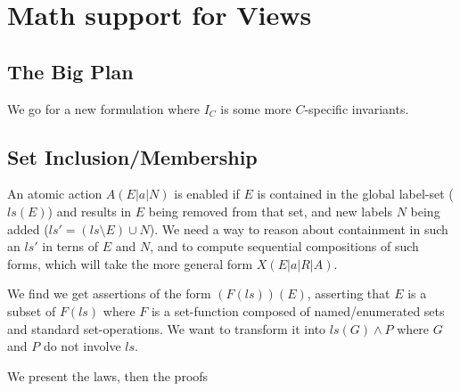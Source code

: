 \section{Math support for Views}\label{ha:mViews}

\subsection{The Big Plan}

We go for a new formulation
where $I_C$ is some more $C$-specific invariants.

\subsection{Set Inclusion/Membership}

An atomic action $A(E|a|N)$ is enabled if $E$ is contained
in the global label-set ($ls(E)$)
and results in $E$ being removed from that set, and new labels
$N$ being added ($ls'=(ls\setminus E)\cup N$).
We need a way to reason about containment in such an $ls'$
in terns of $E$ and $N$, and to compute sequential compositions
of such forms, which will take the more general form $X(E|a|R|A)$.

We find we get assertions of the form $(F(ls))(E)$,
asserting that $E$ is a subset of $F(ls)$ where $F$ is a set-function
composed of named/enumerated sets and standard set-operations.
We want to transform it into $ls(G) \land P$ where $G$ and $P$
do not involve $ls$.

We present the laws,
then the proofs

